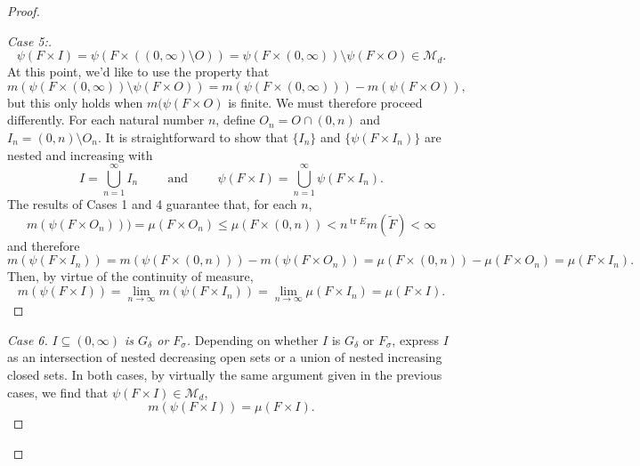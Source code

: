 \documentclass[11pt]{article}
\theoremstyle{theorem}
\newcommand*{\myproofname}{Proof}
\newenvironment{subproof}[1][\myproofname]{\begin{proof}[#1]\renewcommand*{\qedsymbol}{$\mathbin{/\mkern-6mu/}$}}{\end{proof}}
\newcommand\tr{\operatorname{tr}}
\begin{document}
\begin{proof}
\begin{subproof}[Case 5:]
\begin{equation*}
\psi(F\times I)=\psi(F\times ((0,\infty)\setminus O))=\psi(F\times (0,\infty))\setminus \psi(F\times O)\in\mathcal{M}_d.
\end{equation*}
At this point, we'd like to use the property that 
\begin{equation*}
m(\psi(F\times (0,\infty))\setminus \psi(F\times O))=m(\psi(F\times (0,\infty)))-m(\psi(F\times O)),
\end{equation*} but this only holds when $m(\psi(F\times O)$ is finite. We must therefore proceed differently. For each natural number $n$, define $O_n=O\cap(0,n)$ and $I_n=(0,n)\setminus O_n$. It is straightforward to show that $\{I_n\}$ and $\{\psi(F\times I_n)\}$ are nested and increasing with
\begin{equation*}
I=\bigcup_{n=1}^\infty I_n\hspace{1cm}\mbox{and}\hspace{1cm}\psi(F\times I)=\bigcup_{n=1}^\infty \psi(F\times I_n). 
\end{equation*}
The results of Cases 1 and 4 guarantee that, for each $n$,
\begin{equation*}
m(\psi(F\times O_n)))=\mu(F\times O_n)\leq \mu(F\times (0,n))<n^{\tr E}m(\tilde F)<\infty
\end{equation*}
and therefore
\begin{equation*}
m(\psi(F\times I_n))=m(\psi(F\times (0,n)))-m(\psi(F\times O_n))=\mu(F\times (0,n))-\mu(F\times O_n)=\mu(F\times I_n).
\end{equation*}
Then, by virtue of the continuity of measure,
\begin{equation*}
m(\psi(F\times I))=\lim_{n\to\infty}m(\psi(F\times I_n))=\lim_{n\to\infty}\mu(F\times I_n)=\mu(F\times I). 
\end{equation*}
\end{subproof}
\begin{subproof}[Case 6]\textit{$I\subseteq (0,\infty)$ is $G_\delta$ or $F_\sigma$.} Depending on whether $I$ is $G_\delta$ or $F_\sigma$,  express $I$ as an intersection of nested decreasing open sets or a union of nested increasing closed sets. In both cases, by virtually the same argument given in the previous cases, we find that $\psi(F\times I)\in \mathcal{M}_d$,
\begin{equation*}
m(\psi(F\times I))=\mu(F\times I).
\end{equation*}
\end{subproof}
\end{proof}
\end{document}
